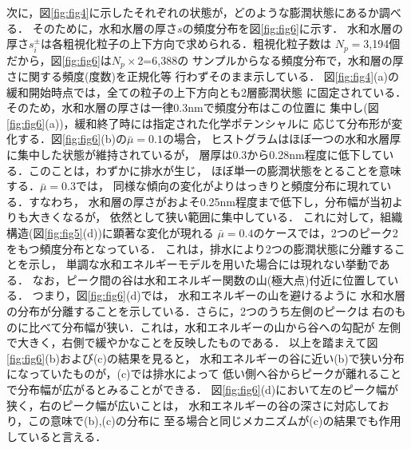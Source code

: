 次に，図\ref{fig:fig4}に示したそれぞれの状態が，どのような膨潤状態にあるか調べる．
そのために，水和水層の厚さ$s$の頻度分布を図\ref{fig:fig6}に示す．
水和水層の厚さ$s_i^\pm$は各粗視化粒子の上下方向で求められる．粗視化粒子数は
$N_p=$3,194個だから，図\ref{fig:fig6}は$N_p\times$2=6,388の
サンプルからなる頻度分布で，水和層の厚さに関する頻度(度数)を正規化等
行わずそのまま示している．
図\ref{fig:fig4}(a)の緩和開始時点では，全ての粒子の上下方向とも2層膨潤状態
に固定されている．そのため，水和水層の厚さは一律0.3nmで頻度分布はこの位置に
集中し(図\ref{fig:fig6}(a))，緩和終了時には指定された化学ポテンシャルに
応じて分布形が変化する．図\ref{fig:fig6}(b)の$\bar{\mu}=0.1$の場合，
ヒストグラムはほぼ一つの水和水層厚に集中した状態が維持されているが，
層厚は0.3から0.28nm程度に低下している．このことは，わずかに排水が生じ，
ほぼ単一の膨潤状態をとることを意味する．$\bar{\mu}=0.3$では，
同様な傾向の変化がよりはっきりと頻度分布に現れている．すなわち，
水和層の厚さがおよそ0.25nm程度まで低下し，分布幅が当初よりも大きくなるが，
依然として狭い範囲に集中している．
これに対して，組織構造(図\ref{fig:fig5}(d))に顕著な変化が現れる
$\bar{\mu}=0.4$のケースでは，2つのピーク2をもつ頻度分布となっている．
これは，排水により2つの膨潤状態に分離することを示し，
単調な水和エネルギーモデルを用いた場合には現れない挙動である．
なお，ピーク間の谷は水和エネルギー関数の山(極大点)付近に位置している．
つまり，図\ref{fig:fig6}(d)では， 水和エネルギーの山を避けるように
水和水層の分布が分離することを示している．さらに，2つのうち左側のピークは
右のものに比べて分布幅が狭い．これは，水和エネルギーの山から谷への勾配が
左側で大きく，右側で緩やかなことを反映したものである．
以上を踏まえて図\ref{fig:fig6}(b)および(c)の結果を見ると，
水和エネルギーの谷に近い(b)で狭い分布になっていたものが，(c)では排水によって
低い側へ谷からピークが離れることで分布幅が広がるとみることができる．
図\ref{fig:fig6}(d)において左のピーク幅が狭く，右のピーク幅が広いことは，
水和エネルギーの谷の深さに対応しており，この意味で(b),(c)の分布に
至る場合と同じメカニズムが(c)の結果でも作用していると言える．

